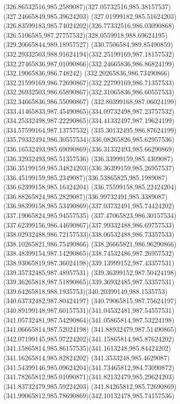 {    \curveto(326.86532516,985.2589087)(327.05732516,985.38157537)(327.24665849,985.39624203)
    \curveto(327.01999182,985.51624203)(326.83599183,985.74024202)(326.77332516,986.03090868)
    \curveto(326.5106585,987.27757532)(328.0559918,988.69624195)(329.20665844,989.18957527)
    \curveto(330.7506584,989.85490859)(332.29332503,988.91624194)(332.25199169,987.18157532)
    \curveto(332.27465836,987.01090866)(332.24665836,986.86824199)(332.19065836,986.748242)
    \curveto(332.20265836,986.73490866)(332.21599169,986.72690867)(332.22799169,986.71357533)
    \curveto(332.26932503,986.65890867)(332.31065836,986.60557533)(332.34665836,986.55090867)
    \curveto(332.80399168,987.06024199)(333.41465833,987.45490865)(334.09732498,987.23757532)
    \curveto(334.25332498,987.22290865)(334.41332497,987.19624199)(334.57599164,987.13757532)
    \curveto(335.30132495,986.87624199)(335.79332494,986.30557534)(336.08265826,985.62957536)
    \curveto(336.16532493,985.69090869)(336.31332493,985.66290869)(336.32932493,985.51357536)
    \curveto(336.33999159,985.4309087)(336.35199159,985.34824203)(336.36399159,985.26957537)
    \curveto(336.45199159,985.2349087)(336.53865825,985.1989087)(336.62399158,985.16424204)
    \curveto(336.75599158,985.22424204)(336.88265824,985.2829087)(336.99732491,985.3389087)
    \curveto(336.98399158,985.53490869)(337.03732491,985.74424202)(337.19065824,985.94557535)
    \curveto(337.47065823,986.30157534)(337.62399156,986.44690867)(337.99332488,986.69757533)
    \curveto(338.02932488,986.72157533)(338.06532488,986.73357533)(338.10265821,986.75490866)
    \curveto(338.26665821,986.96290866)(338.48399154,987.14290865)(338.74532486,987.26957532)
    \curveto(338.93065819,987.36024198)(339.13999152,987.43357531)(339.35732485,987.48957531)
    \curveto(339.36399152,987.50424198)(339.36265818,987.51890865)(339.36932485,987.53357531)
    \curveto(339.64265818,988.1935753)(340.20399149,988.1535753)(340.63732482,987.80424197)
    \curveto(340.79065815,987.75624197)(340.89199148,987.60157531)(341.04532481,987.54557531)
    \curveto(341.05732481,987.54290864)(341.05865814,987.53224198)(341.06665814,987.52024198)
    \curveto(341.88932479,987.51490865)(342.07199145,985.97224202)(341.15865814,985.87624202)
    \curveto(341.15865814,985.86157535)(341.1613248,985.84424202)(341.16265814,985.82824202)
    \curveto(341.3533248,985.4629087)(341.54399146,985.09624204)(341.73465812,984.73090872)
    \curveto(341.78265812,985.01090871)(341.82132479,985.29624203)(341.83732479,985.59224203)
    \curveto(341.84265812,985.72690869)(341.99065812,985.78690869)(342.10132478,985.74157536)
}
